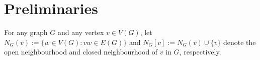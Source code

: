 \documentclass[kpfonts]{patmorin}
\newcommand{\snote}[1]{\fcolorbox{red}{yellow}{#1}}
\DeclareMathOperator{\A}{\mathds{A}}
\begin{document}
% 
% 
% 


% 



\section{Preliminaries}

For any graph $G$ and any vertex $v\in V(G)$, let $N_G(v):=\{w\in V(G): vw\in E(G)\}$ and $N_G[v]:=N_G(v)\cup\{v\}$ denote the open neighbourhood and closed neighbourhood of $v$ in $G$, respectively.
\end{document}
